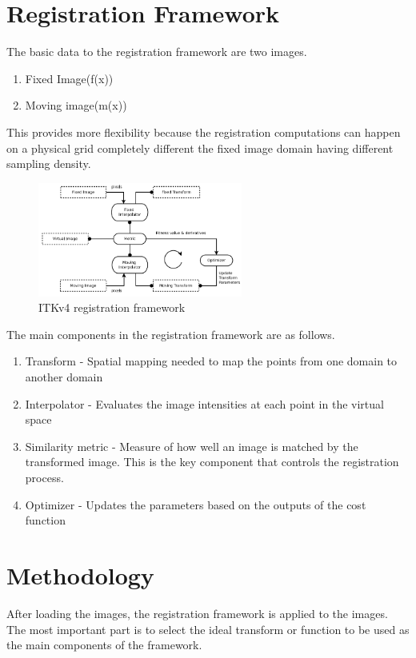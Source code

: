 \documentclass[11pt,english]{article}
\begin{document}
\section*{Registration Framework\cite{itkmanual2}}
The basic data to the registration framework are two images.  
\begin{enumerate}
    \item Fixed Image(f(x))
    \item Moving image(m(x))
\end{enumerate}
This provides more flexibility because the registration computations can happen on a physical grid completely different the fixed image domain having different sampling density. 
\begin{figure}[h!]
    \centering
    \includegraphics[width =0.6\textwidth] {images/framework.PNG}
    \caption{ITKv4 registration framework\cite{itkmanual2}}
    \label{fig:framework}
\end{figure}
The main components in the registration framework are as follows.
\begin{enumerate}
    \item Transform - Spatial mapping needed to map the points from one domain to another domain
    \item Interpolator - Evaluates the image intensities at each point in the virtual space
    \item Similarity metric - Measure of how well an image is matched by the transformed image. This is the key component that controls the registration process.
    \item Optimizer - Updates the parameters based on the outputs of the cost function
\end{enumerate}
\section*{Methodology}
After loading the images, the registration framework is applied to the images. The most important part is to select the ideal transform or function to be used as the main components of the framework.  
\end{document}
